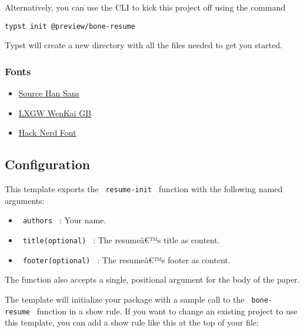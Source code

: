 Alternatively, you can use the CLI to kick this project off using the
command

\begin{verbatim}
typst init @preview/bone-resume
\end{verbatim}

Typst will create a new directory with all the files needed to get you
started.

\subsubsection{Fonts}\label{fonts}

\begin{itemize}
\tightlist
\item
  \href{https://github.com/adobe-fonts/source-han-sans}{Source Han Sans}
\item
  \href{https://github.com/lxgw/LxgwWenkaiGB}{LXGW WenKai GB}
\item
  \href{https://www.nerdfonts.com/}{Hack Nerd Font}
\end{itemize}

\subsection{Configuration}\label{configuration}

This template exports the \texttt{\ resume-init\ } function with the
following named arguments:

\begin{itemize}
\tightlist
\item
  \texttt{\ authors\ } : Your name.
\item
  \texttt{\ title(optional)\ } : The resumeâ€™s title as content.
\item
  \texttt{\ footer(optional)\ } : The resumeâ€™s footer as content.
\end{itemize}

The function also accepts a single, positional argument for the body of
the paper.

The template will initialize your package with a sample call to the
\texttt{\ bone-resume\ } function in a show rule. If you want to change
an existing project to use this template, you can add a show rule like
this at the top of your file:

\begin{Shaded}
\begin{Highlighting}[]

\NormalTok{)}


\end{Highlighting}
\end{Shaded}

